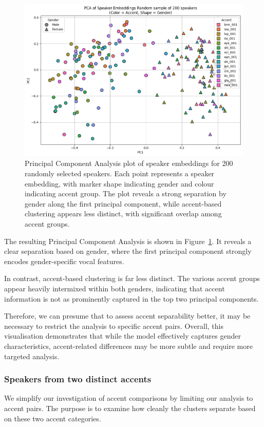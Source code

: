 \documentclass[conference]{IEEEtran}
\begin{document}
	\begin{figure}[H]
		\centering
		\includegraphics[width=0.7\linewidth]{img/img-cluster-all}
		\caption{Principal Component Analysis plot of speaker embeddings for 200 randomly selected speakers. Each point represents a speaker embedding, with marker shape indicating gender and colour indicating accent group. The plot reveals a strong separation by gender along the first principal component, while accent-based clustering appears less distinct, with significant overlap among accent groups.}
		\label{fig:img-cluster-all}
	\end{figure}
	
	
	The resulting Principal Component Analysis is shown in Figure~\ref{fig:img-cluster-all}. It reveals a clear separation based on gender, where the first principal component strongly encodes gender-specific vocal features. 
	
	In contrast, accent-based clustering is far less distinct. The various accent groups appear heavily intermixed within both genders, indicating that accent information is not as prominently captured in the top two principal components. 
	
	
	Therefore, we can presume that to assess accent separability better, it may be necessary to restrict the analysis to specific accent pairs. Overall, this visualisation demonstrates that while the model effectively captures gender characteristics, accent-related differences may be more subtle and require more targeted analysis.
	
	
	
	
	\subsubsection{Speakers from two distinct accents}
	
	We simplify our investigation of accent comparisons by limiting our analysis to accent pairs. The purpose is to examine how cleanly the clusters separate based on these two accent categories.
	
\end{document}
